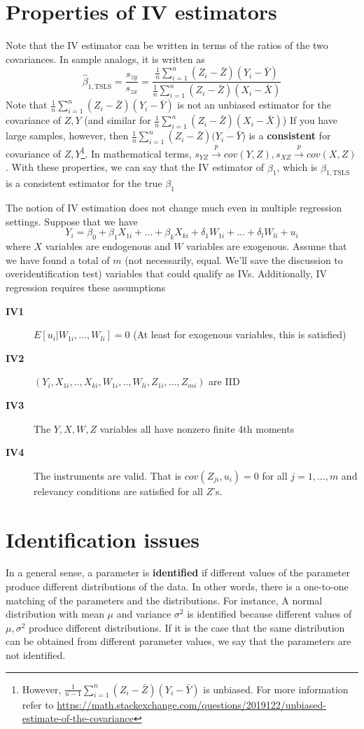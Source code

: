 \section{Properties of IV estimators}
Note that the IV estimator can be written in terms of the ratios of the two covariances. In sample analogs, it is written as
\[
\hat{\beta}_{1,\text{TSLS}}=\frac{s_{zy}}{s_{zx}}=\frac{\frac{1}{n}\sum_{i=1}^n(Z_i-\bar{Z})(Y_i-\bar{Y})}{\frac{1}{n}\sum_{i=1}^n(Z_i-\bar{Z})(X_i-\bar{X})}
\]
Note that $\frac{1}{n}\sum_{i=1}^n(Z_i-\bar{Z})(Y_i-\bar{Y})$ is not an unbiased estimator for the covariance of $Z,Y$ (and similar for $\frac{1}{n}\sum_{i=1}^n(Z_i-\bar{Z})(X_i-\bar{X})$) If you have large samples, however, then $\frac{1}{n}\sum_{i=1}^n(Z_i-\bar{Z})(Y_i-\bar{Y}$) is a \textbf{consistent} for covariance of $Z,Y$\footnote{However, $\frac{1}{n-1}\sum_{i=1}^n(Z_i-\bar{Z})(Y_i-\bar{Y})$ is unbiased. For more information refer to \url{https://math.stackexchange.com/questions/2019122/unbiased-estimate-of-the-covariance}}. In mathematical terms, $s_{YZ}\xrightarrow{p} cov(Y,Z),  s_{XZ}\xrightarrow{p} cov(X,Z)$. With these properties, we can say that the IV estimator of $\beta_1$, which is $\hat{\beta}_{1,\text{TSLS}}$ is a consistent estimator for the true $\beta_1$ \par\medskip

The notion of IV estimation does not change much even in multiple regression settings. Suppose that we have
\[
Y_i = \beta_0 + \beta_1X_{1i} +...+ \beta_kX_{ki} + \delta_1W_{1i}+...+\delta_lW_{li}+u_i 
\]
where $X$ variables are endogenous and $W$ variables are exogenous. Assume that we have found a total of $m$ (not necessarily, equal. We'll save the discussion to overidentification test) variables that could qualify as IVs. Additionally, IV regression requires these assumptions 
\begin{description}
\item[\textbf{IV1}] $E[u_i|W_{1i},...,W_{li}]=0$ (At least for exogenous variables, this is satisfied)
\item[\textbf{IV2}] $(Y_i,X_{1i},..,X_{ki},W_{1i},..,W_{li},Z_{1i},...,Z_{mi})$ are IID
\item[\textbf{IV3}] The $Y,X,W,Z$ variables all have nonzero finite 4th moments
\item[\textbf{IV4}] The instruments are valid. That is $cov(Z_{ji},u_i)=0$ for all $j=1,...,m$ and relevancy conditions are satisfied for all $Z$'s. 
\end{description}
\section{Identification issues}
In a general sense, a parameter is \textbf{identified} if different values of the parameter produce different distributions of the data. In other words, there is a one-to-one matching of the parameters and the distributions. For instance, A normal distribution with mean $\mu$ and variance $\sigma^2$ is identified because different values of $\mu, \sigma^2$ produce different distributions. If it is the case that the same distribution can be obtained from different parameter values, we say that the parameters are not identified. \par\medskip


